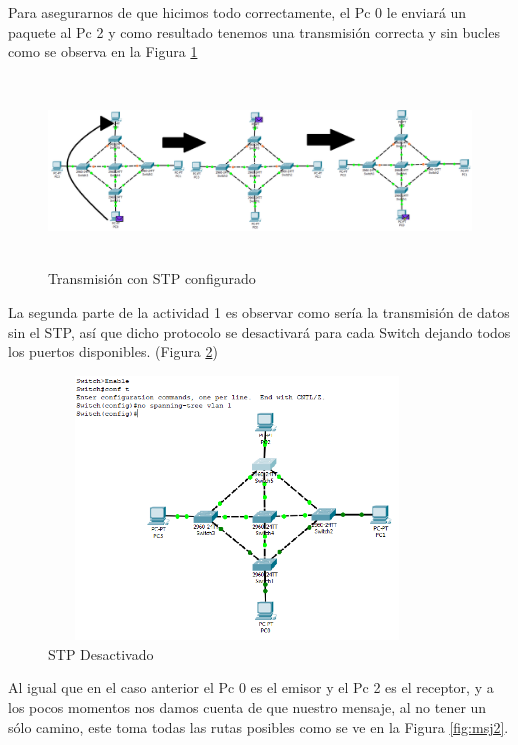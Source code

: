 \documentclass{article}
\begin{document}
Para asegurarnos de que hicimos todo correctamente, el Pc 0 le enviará un paquete al Pc 2 y como resultado tenemos una transmisión correcta y sin bucles como se observa en la Figura \ref{fig:msj1}\\

\begin{figure}[h!]
\centering
\includegraphics[height=5cm,width=13cm]{mensaje1.png}
\caption{Transmisión con STP configurado}
\label{fig:msj1}
\end{figure}

\newpage
La segunda parte de la actividad 1 es observar como sería la transmisión de datos sin el STP, así que dicho protocolo se desactivará para cada Switch dejando todos los puertos disponibles. (Figura \ref{fig:stpdes}) 

\begin{figure}[h!]
\centering
\includegraphics[height=7cm,width=10cm]{Nospanningtree.png}
\caption{STP Desactivado}
\label{fig:stpdes}
\end{figure}

Al igual que en el caso anterior el Pc 0 es el emisor y el Pc 2 es el receptor, y a los pocos momentos nos damos cuenta de que nuestro mensaje, al no tener un sólo camino, este toma todas las rutas posibles como se ve en la Figura \ref{fig:msj2}.
\end{document}
